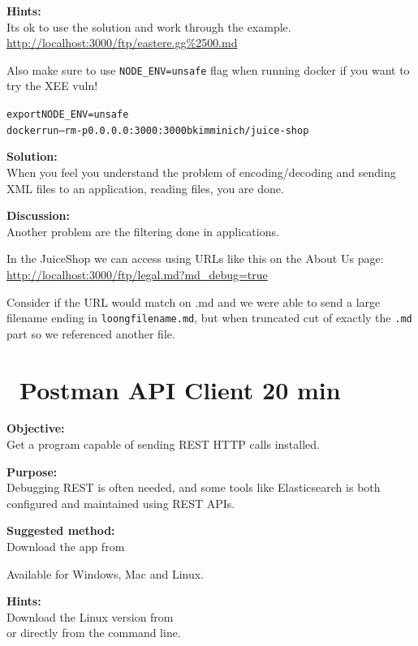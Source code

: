 \documentclass[a4paper,11pt,notitlepage]{report}
\begin{document}
{\bf Hints:}\\
Its ok to use the solution and work through the example.
\url{http://localhost:3000/ftp/eastere.gg%2500.md}

Also make sure to use \verb+NODE_ENV=unsafe+ flag when running docker if you want to try the XEE vuln!

\begin{alltt}
export NODE_ENV=unsafe
docker run --rm -p 0.0.0.0:3000:3000 bkimminich/juice-shop
\end{alltt}

{\bf Solution:}\\
When you feel you understand the problem of encoding/decoding and sending XML files to an application, reading files, you are done.

{\bf Discussion:}\\
Another problem are the filtering done in applications.

In the JuiceShop we can access using URLs like this on the About Us page:\\
\url{http://localhost:3000/ftp/legal.md?md_debug=true}

Consider if the URL would match on .md and we were able to send a large filename ending in \verb+loongfilename.md+, but when truncated cut of exactly the \verb+.md+ part so we referenced another file.




\chapter{\faInfoCircle\ Postman API Client 20 min}
\label{ex:postman-api}


{\bf Objective:}\\
Get a program capable of sending REST HTTP calls installed.


{\bf Purpose:}\\
Debugging REST is often needed, and some tools like Elasticsearch is both configured and maintained using REST APIs.

{\bf Suggested method:}\\
Download the app from

Available for Windows, Mac and Linux.

{\bf Hints:}\\
Download the Linux version from \\
or directly from the command line.
\end{document}
